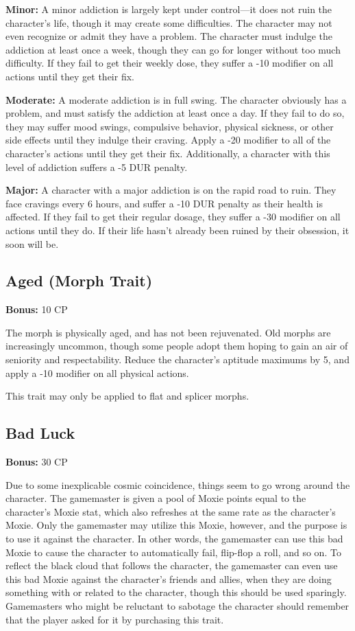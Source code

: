\textbf{Minor:} A minor addiction is largely kept under control—it does not ruin the character’s life, though it may create some difficulties. The character may not even recognize or admit they have a problem. The character must indulge the addiction at least once a week, though they can go for longer without too much difficulty. If they fail to get their weekly dose, they suffer a -10 modifier on all actions until they get their fix.

\textbf{Moderate:} A moderate addiction is in full swing. The character obviously has a problem, and must satisfy the addiction at least once a day. If they fail to do so, they may suffer mood swings, compulsive behavior, physical sickness, or other side effects until they indulge their craving. Apply a -20 modifier to all of the character’s actions until they get their fix. Additionally, a character with this level of addiction suffers a -5 DUR penalty.

\textbf{Major:} A character with a major addiction is on the rapid road to ruin. They face cravings every 6 hours, and suffer a -10 DUR penalty as their health is affected. If they fail to get their regular dosage, they suffer a -30 modifier on all actions until they do. If their life hasn’t already been ruined by their obsession, it soon will be.

\subsection{Aged (Morph Trait)} \textbf{Bonus:} 10 CP

The morph is physically aged, and has not been rejuvenated. Old morphs are increasingly uncommon, though some people adopt them hoping to gain an air of seniority and respectability. Reduce the character’s aptitude maximums by 5, and apply a -10 modifier on all physical actions.

This trait may only be applied to flat and splicer morphs.

\subsection{Bad Luck}
\label{sec:traits-bad-luck}

\textbf{Bonus:} 30 CP

Due to some inexplicable cosmic coincidence, things seem to go wrong around the character. The gamemaster is given a pool of Moxie points equal to the character’s Moxie stat, which also refreshes at the same rate as the character’s Moxie. Only the gamemaster may utilize this Moxie, however, and the purpose is to use it against the character. In other words, the gamemaster can use this bad Moxie to cause the character to automatically fail, flip-flop a roll, and so on. To reflect the black cloud that follows the character, the gamemaster can even use this bad Moxie against the character’s friends and allies, when they are doing something with or related to the character, though this should be used sparingly. Gamemasters who might be reluctant to sabotage the character should remember that the player asked for it by purchasing this trait.

